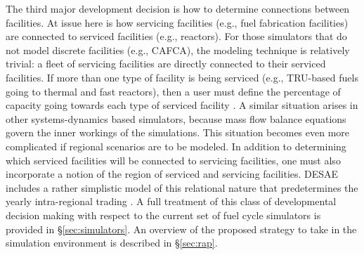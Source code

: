 The third major development decision is how to determine connections between
facilities. At issue here is how servicing facilities (e.g., fuel fabrication
facilities) are connected to serviced facilities (e.g., reactors). For those
simulators that do not model discrete facilities (e.g., CAFCA), the modeling
technique is relatively trivial: a fleet of servicing facilities are directly
connected to their serviced facilities. If more than one type of facility is
being serviced (e.g., TRU-based fuels going to thermal and fast reactors), then
a user must define the percentage of capacity going towards each type of
serviced facility \cite{busquim_e_silva_system_2008}. A similar situation arises
in other systems-dynamics based simulators, because mass flow balance equations
govern the inner workings of the simulations. This situation becomes even more
complicated if regional scenarios are to be modeled. In addition to determining
which serviced facilities will be connected to servicing facilities, one must
also incorporate a notion of the region of serviced and servicing
facilities. DESAE includes a rather simplistic model of this relational nature
that predetermines the yearly intra-regional trading \cite{iaea_nuclear_2010}. A
full treatment of this class of developmental decision making with respect to
the current set of fuel cycle simulators is provided in
\S\ref{sec:simulators}. An overview of the proposed strategy to take in the
\Cyclus simulation environment is described in \S\ref{sec:rap}.
